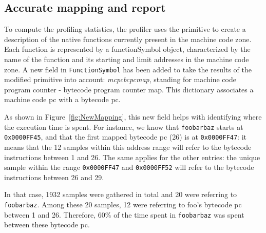 \documentclass[10pt,preprint,nonatbib]{sigplanconf}
\newcommand{\ct}{\lstinline[backgroundcolor=\color{white},basicstyle=\small\ttfamily]}
\newcommand{\figref}[1]{Figure~\ref{fig:#1}}
\begin{document}
\subsection{Accurate mapping and report}

To compute the profiling statistics, the profiler uses the primitive to create a description of the native functions currently present in the machine code zone.  Each function is represented by a functionSymbol object, characterized by the name of the function and its starting and limit addresses in the machine code zone.
A new field in \ct{FunctionSymbol} has been added to take the results of the modified primitive into account: \textit{mcpcbcpcmap}, standing for machine code program counter - bytecode program counter map. This dictionary associates a machine code pc with a bytecode pc.

As shown in \figref{NewMapping}, this new field helps with identifying where the execution time is spent. For instance, we know that \ct{foobarbaz} starts at \ct{0x0000FF45}, and that the first mapped bytecode pc (26) is at \ct{0x0000FF47}: it means that the 12 samples within this address range will refer to the bytecode instructions between 1 and 26.
The same applies for the other entries: the unique sample within the range \ct{0x0000FF47} and \ct{0x0000FF52} will refer to the bytecode instructions between 26 and 29. 

In that case, 1932 samples were gathered in total and 20 were referring to \ct{foobarbaz}. Among these 20 samples, 12 were referring to foo's bytecode pc between 1 and 26. Therefore, 60\% of the time spent in \ct{foobarbaz} was spent between these bytecode pc.
\end{document}
